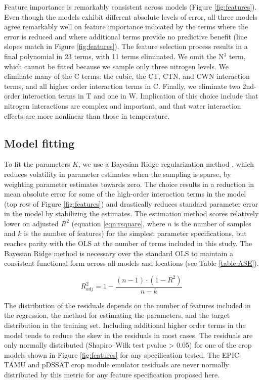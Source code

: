 \documentclass[gmd, manuscript]{copernicus} %
\begin{document}
Feature importance is remarkably consistent across models (Figure \ref{fig:features}). 
Even though the models exhibit different absolute levels of error, all three models agree remarkably well on feature importance indicated by the terms where the error is reduced and where additional terms provide no predictive benefit (line slopes match in Figure \ref{fig:features}). 
The feature selection process results in a final polynomial in 23 terms, with 11 terms eliminated. 
We omit the N$^3$ term, which cannot be fitted because we sample only three nitrogen levels. 
We eliminate many of the C terms: the cubic, the CT, CTN, and CWN interaction terms, and all higher order interaction terms in C. 
Finally, we eliminate two 2nd-order interaction terms in T and one in W. 
Implication of this choice include that nitrogen interactions are complex and important, and that water interaction effects are more nonlinear than those in temperature. 

\subsection{Model fitting}
To fit the parameters $K$, we use a Bayesian Ridge regularization method \citep{MacKay91}, which reduces volatility in parameter estimates when the sampling is sparse, by weighting parameter estimates towards zero. 
The choice results in a reduction in mean absolute error for some of the high-order interaction terms in the model (top row of Figure \ref{fig:features}) and drastically reduces standard parameter error in the model by stabilizing the estimates.
The estimation method scores relatively lower on adjusted $R^2$ (equation \ref{eqn:rsquare}, where $n$ is the number of samples and $k$ is the number of features) for the simplest parameter specifications, but reaches parity with the OLS at the number of terms included in this study.
The Bayesian Ridge method is necessary over the standard OLS to maintain a consistent functional form across all models and locations (see Table \ref{table:ASE}). 

\begin{equation}
    \label{eqn:rsquare}
    R^{2}_{adj} = 1 - \frac{(n-1) \cdot (1 - R^{2})}{n - k}
\end{equation}

The distribution of the residuals depends on the number of features included in the regression, the method for estimating the parameters, and the target distribution in the training set. 
Including additional higher order terms in the model tends to reduce the skew in the residuals in most cases.
The residuals are only normally distributed (Shapiro–Wilk test \citep{Shapiro1965} pvalue > 0.05) for one of the crop models shown in Figure \ref{fig:features} for any specification tested.
The EPIC-TAMU and pDSSAT crop module emulator residuals are never normally distributed by this metric for any feature specification proposed here. 
\end{document}
